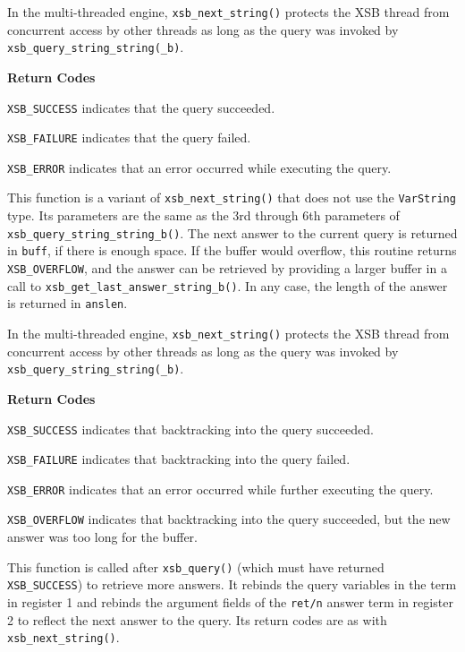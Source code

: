 \begin{description}
In the multi-threaded engine, {\tt xsb\_next\_string()} protects the
XSB thread from concurrent access by other threads as long as the
query was invoked by {\tt xsb\_query\_string\_string(\_b)}.

{\bf Return Codes}  
\bi
\item {\tt XSB\_SUCCESS} indicates that the query succeeded.
%
\item {\tt XSB\_FAILURE} indicates that the query failed.
%
\item {\tt XSB\_ERROR} indicates that an error occurred while
  executing the query.  
%
\ei

%
This function is a variant of {\tt xsb\_next\_string()} that does not
use the {\tt VarString} type.  Its parameters are the same as the 3rd
through 6th parameters of {\tt xsb\_query\_string\_string\_b()}.  The
next answer to the current query is returned in \verb|buff|, if there
is enough space.  If the buffer would overflow, this routine returns
{\tt XSB\_OVERFLOW}, and the answer can be retrieved by providing a
larger buffer in a call to {\tt xsb\_get\_last\_answer\_string\_b()}.
In any case, the length of the answer is returned in \verb|anslen|.

In the multi-threaded engine, {\tt xsb\_next\_string()} protects the
XSB thread from concurrent access by other threads as long as the
query was invoked by {\tt xsb\_query\_string\_string(\_b)}.

{\bf Return Codes}  
\bi
\item {\tt XSB\_SUCCESS} indicates that backtracking into the query succeeded.
%
\item {\tt XSB\_FAILURE} indicates that backtracking into the query failed.
%
\item {\tt XSB\_ERROR} indicates that an error occurred while further
  executing the query.

\item {\tt XSB\_OVERFLOW} indicates that backtracking into the query succeeded, but the
  new answer was too long for the buffer.
%
\ei

%
This function is called after {\tt xsb\_query()} (which must have
returned {\tt XSB\_SUCCESS}) to retrieve more answers.  It rebinds the
query variables in the term in register 1 and rebinds the argument
fields of the {\tt ret/n} answer term in register 2 to reflect the
next answer to the query.  Its return codes are as with {\tt
  xsb\_next\_string()}.


\end{description}
